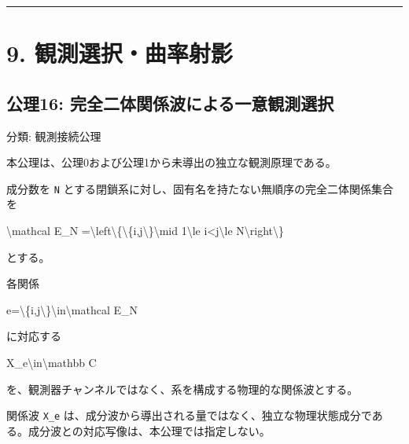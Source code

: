 \documentclass[
  a4paper,
]{ltjsarticle}
\newenvironment{Shaded}{}{}
\newcommand{\NormalTok}[1]{#1}
\begin{document}
\begin{center}\rule{0.5\linewidth}{0.5pt}\end{center}

\section{9.
観測選択・曲率射影}\label{ux89b3ux6e2cux9078ux629eux66f2ux7387ux5c04ux5f71}

\subsection{公理16:
完全二体関係波による一意観測選択}\label{ux516cux740616-ux5b8cux5168ux4e8cux4f53ux95a2ux4fc2ux6ce2ux306bux3088ux308bux4e00ux610fux89b3ux6e2cux9078ux629e}

分類: 観測接続公理

本公理は、公理0および公理1から未導出の独立な観測原理である。

成分数を \texttt{N}
とする閉鎖系に対し、固有名を持たない無順序の完全二体関係集合を

\begin{Shaded}
\begin{Highlighting}[]
\NormalTok{\textbackslash{}mathcal E\_N}
\NormalTok{=\textbackslash{}left\textbackslash{}\{\textbackslash{}\{i,j\textbackslash{}\}\textbackslash{}mid 1\textbackslash{}le i\textless{}j\textbackslash{}le N\textbackslash{}right\textbackslash{}\}}
\end{Highlighting}
\end{Shaded}

とする。

各関係

\begin{Shaded}
\begin{Highlighting}[]
\NormalTok{e=\textbackslash{}\{i,j\textbackslash{}\}\textbackslash{}in\textbackslash{}mathcal E\_N}
\end{Highlighting}
\end{Shaded}

に対応する

\begin{Shaded}
\begin{Highlighting}[]
\NormalTok{X\_e\textbackslash{}in\textbackslash{}mathbb C}
\end{Highlighting}
\end{Shaded}

を、観測器チャンネルではなく、系を構成する物理的な関係波とする。

関係波 \texttt{X\_e}
は、成分波から導出される量ではなく、独立な物理状態成分である。成分波との対応写像は、本公理では指定しない。
\end{document}
